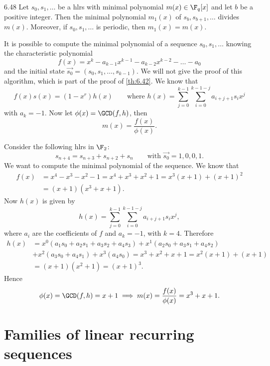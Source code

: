\begin{teor}{}{6.48}
	Let \(s_0,s_1,\ldots\) be a hlrs with minimal polynomial \(m(x)\in\F_q[x]\) and let \(b\) be a positive integer. Then the minimal polynomial \(m_1(x)\) of \(s_b,s_{b+1},\ldots\) divides \(m(x)\). Moreover, if \(s_0,s_1,\ldots\) is periodic, then \(m_1(x)=m(x)\). 
\end{teor}

\begin{oss}\label{minAlg}
	It is possible to compute the minimal polynomial of a sequence \(s_0,s_1,\ldots\) knowing the characteristic polynomial
	\[
		f(x) = x^k-a_{k-1}x^{k-1}-a_{k-2}x^{k-2}-\ldots-a_0
	\]
	and the initial state \(\vec{s_0}=(s_0,s_1,\ldots,s_{k-1})\). We will not give the proof of this algorithm, which is part of the proof of \autoref{th:6.42}. We know that
	\[
		f(x)s(x) = (1-x^r)h(x) \qquad\text{where }h(x) = \sum_{j=0}^{k-1}\sum_{i=0}^{k-1-j}a_{i+j+1}s_i x^j
	\]
	with \(a_k=-1\). Now let \(\phi(x) = \GCD(f,h)\), then
	\[
		m(x) = \frac{f(x)}{\phi(x)}.
	\]
\end{oss}

\begin{ese}
	Consider the following hlrs in \(\F_2\):
	\[
		s_{n+4}=s_{n+3}+s_{n+2}+s_n \qquad\text{with }\vec{s_0}={1,0,0,1}.
	\]
	We want to compute the minimal polynomial of the sequence. We know that
	\begin{align*}
		f(x) & = x^4-x^3-x^2-1 = x^4+x^3+x^2+1 = x^3(x+1) + (x+1)^2 \\
		     & = (x+1)(x^3+x+1).
	\end{align*}
	Now \(h(x)\) is given by
	\[
		h(x) = \sum_{j=0}^{k-1}\sum_{i=0}^{k-1-j}a_{i+j+1}s_i x^j,
	\]
	where \(a_i\) are the coefficients of \(f\) and \(a_k=-1\), with \(k=4\). Therefore
	\begin{align*}
		h(x) & = x^0(a_1s_0+a_2s_1+a_3s_2+a_4s_3) + x^1(a_2s_0+a_3s_1+a_4s_2)      \\
		     & + x^2(a_3s_0+a_4s_1) + x^3(a_4s_0) = x^3+x^2+x+1 = x^2(x+1) + (x+1) \\
		     & = (x+1)(x^2+1) = (x+1)^3.
	\end{align*}
	Hence
	\[
		\phi(x) = \GCD(f,h) = x+1 \implies m(x) = \frac{f(x)}{\phi(x)} = x^3+x+1.
	\]
\end{ese}

\section{Families of linear recurring sequences}

